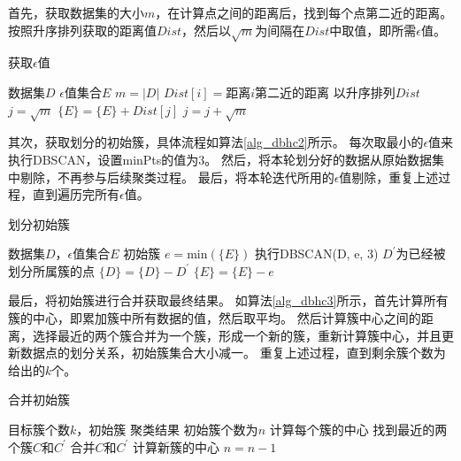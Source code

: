 首先，获取数据集的大小$ m $，在计算点之间的距离后，找到每个点第二近的距离。按照升序排列获取的距离值$ Dist $，然后以$ \sqrt{m} $为间隔在$ Dist $中取值，即所需$\epsilon$值。
\begin{algorithm}[htbp]
	\renewcommand{\algorithmicrequire}{\textbf{输入:}}
	\renewcommand{\algorithmicensure}{\textbf{输出:}}
	\caption{获取$\epsilon$值}
	\label{alg_dbhc1}
	\begin{algorithmic}[1]
		\REQUIRE 数据集$ D $
		\ENSURE $\epsilon$值集合$ E $
		\STATE $ m = |D| $
		\STATE $ Dist[i] =$距离$i$第二近的距离
		\ENDFOR
		\STATE 以升序排列$ Dist $
		\STATE $ j = \sqrt{m} $
		\STATE $ \{E\} = \{E\} + Dist[j] $
		\STATE $ j = j + \sqrt{m} $
		\ENDWHILE
	\end{algorithmic}
\end{algorithm}

其次，获取划分的初始簇，具体流程如算法\ref{alg_dbhc2}所示。
每次取最小的$\epsilon$值来执行DBSCAN，设置minPts的值为3。
然后，将本轮划分好的数据从原始数据集中剔除，不再参与后续聚类过程。
最后，将本轮迭代所用的$\epsilon$值剔除，重复上述过程，直到遍历完所有$\epsilon$值。
\begin{algorithm}[htbp]
	\renewcommand{\algorithmicrequire}{\textbf{输入:}}
	\renewcommand{\algorithmicensure}{\textbf{输出:}}
	\caption{划分初始簇}
	\label{alg_dbhc2}
	\begin{algorithmic}[1]
		\REQUIRE 数据集$ D $，$\epsilon$值集合$ E $
		\ENSURE 初始簇
		\STATE $ e = \text{min}(\{E\}) $
		\STATE 执行DBSCAN(D, e, 3)
		\STATE $ D^{\prime} $为已经被划分所属簇的点
		\STATE $ \{D\} = \{D\} - D^{\prime} $
		\STATE $ \{E\} = \{E\} - e $
		\ENDWHILE
	\end{algorithmic}
\end{algorithm}

最后，将初始簇进行合并获取最终结果。
如算法\ref{alg_dbhc3}所示，首先计算所有簇的中心，即累加簇中所有数据的值，然后取平均。
然后计算簇中心之间的距离，选择最近的两个簇合并为一个簇，形成一个新的簇，重新计算簇中心，并且更新数据点的划分关系，初始簇集合大小减一。
重复上述过程，直到剩余簇个数为给出的$ k $个。

\begin{algorithm}[htbp]
	\renewcommand{\algorithmicrequire}{\textbf{输入:}}
	\renewcommand{\algorithmicensure}{\textbf{输出:}}
	\caption{合并初始簇}
	\label{alg_dbhc3}
	\begin{algorithmic}[1]
		\REQUIRE 目标簇个数$ k $，初始簇
		\ENSURE 聚类结果
		\STATE 初始簇个数为$ n $
		\STATE 计算每个簇的中心
		\STATE 找到最近的两个簇$ C $和$ C^{\prime} $
		\STATE 合并$ C $和$ C^{\prime} $
		\STATE 计算新簇的中心
		\STATE $ n = n-1 $
		\ENDWHILE
	\end{algorithmic}
\end{algorithm}
